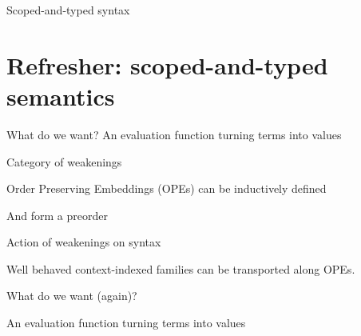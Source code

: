 \documentclass[aspectratio=169]{beamer}
\begin{document}
\begin{frame}{Scoped-and-typed syntax}

  \bigskip

\end{frame}

\section{Refresher: scoped-and-typed semantics}

\begin{frame}{What do we want?}
  An evaluation function turning terms into values

\end{frame}

\begin{frame}{Category of weakenings}

  Order Preserving Embeddings (OPEs) can be inductively defined


  \bigskip

  And form a preorder

  \begin{AgdaSuppressSpace}
  \end{AgdaSuppressSpace}
\end{frame}

\begin{frame}{Action of weakenings on syntax}

  Well behaved context-indexed families can be transported along OPEs.



\end{frame}

\begin{frame}{What do we want (again)?}

  An evaluation function turning terms into values

\bigskip


\bigskip
\end{frame}
\end{document}
